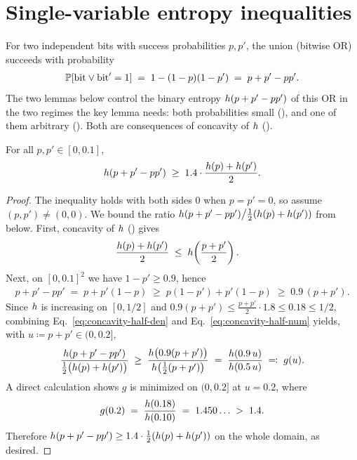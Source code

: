 \section{Single-variable entropy inequalities}
\label{sec:single-var}

For two independent bits with success probabilities $p, p'$, the union (bitwise
OR) succeeds with probability
\begin{align*}
\mathbb{P}[\text{bit} \vee \text{bit}' = 1] \;=\; 1 - (1-p)(1-p') \;=\; p + p' - p p'.
\end{align*}
The two lemmas below control the binary entropy $h(p + p' - p p')$ of this OR
in the two regimes the key lemma needs: both probabilities small
(), and one of them arbitrary ().
Both are consequences of concavity of $h$ ().

\begin{lemma}
\label{lem:concavity-half}
For all $p, p' \in [0, 0.1]$,
\begin{align*}
h(p + p' - p p') \;\ge\; 1.4 \cdot \frac{h(p) + h(p')}{2}.
\end{align*}
\end{lemma}

\begin{proof}
The inequality holds with both sides $0$ when $p = p' = 0$, so assume
$(p,p') \ne (0,0)$. We bound the ratio
$h(p + p' - p p') \big/ \tfrac{1}{2}(h(p) + h(p'))$ from below. First,
concavity of $h$ () gives
\begin{align}
\frac{h(p) + h(p')}{2}
&\;\le\; h\!\left(\frac{p + p'}{2}\right). \label{eq:concavity-half-den}
\end{align}
Next, on $[0,0.1]^2$ we have $1 - p' \ge 0.9$, hence
\begin{align}
p + p' - p p' \;=\; p + p'(1 - p) \;\ge\; p(1-p') + p'(1-p) \;\ge\; 0.9\,(p + p'). \label{eq:concavity-half-num}
\end{align}
Since $h$ is increasing on $[0, 1/2]$ and $0.9(p+p') \le \tfrac{p+p'}{2}\cdot 1.8 \le 0.18 \le 1/2$,
combining Eq.~\eqref{eq:concavity-half-den} and Eq.~\eqref{eq:concavity-half-num}
yields, with $u \coloneqq p + p' \in (0, 0.2]$,
\begin{align*}
\frac{h(p + p' - p p')}{\tfrac{1}{2}\bigl(h(p) + h(p')\bigr)}
\;\ge\; \frac{h\bigl(0.9(p+p')\bigr)}{h\bigl(\tfrac{1}{2}(p+p')\bigr)}
\;=\; \frac{h(0.9\,u)}{h(0.5\,u)}
\;\eqqcolon\; g(u).
\end{align*}
A direct calculation shows $g$ is minimized on $(0, 0.2]$ at $u = 0.2$, where
\begin{align*}
g(0.2) \;=\; \frac{h(0.18)}{h(0.10)} \;=\; 1.450\ldots \;>\; 1.4.
\end{align*}
Therefore $h(p + p' - p p') \ge 1.4 \cdot \tfrac{1}{2}(h(p) + h(p'))$ on the
whole domain, as desired.
\end{proof}


